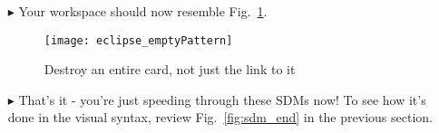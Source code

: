 \begin{itemize}
\vspace{0.5cm}

\item[$\blacktriangleright$] Your workspace should now resemble Fig.~\ref{fig:emptyPattern}.

\vspace{0.5cm}

\begin{figure}[htpb]
\begin{center}
  \texttt{[image: eclipse\_emptyPattern]}
  \caption{Destroy an entire card, not just the link to it}
  \label{fig:emptyPattern}
\end{center}
\end{figure}

\item[$\blacktriangleright$] That's it - you're just speeding through these SDMs now! To see how it's done in the visual syntax, review Fig.~\ref{fig:sdm_end}
in the previous section.

\end{itemize}
